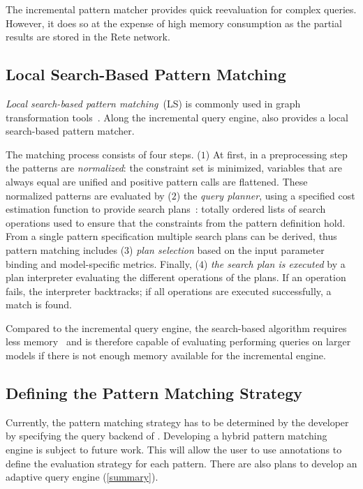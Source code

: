 \documentclass[submission,copyright,creativecommons]{eptcs}
\begin{document}
The incremental pattern matcher provides quick reevaluation for complex queries. However, it does so at the expense of high memory consumption as the partial results are stored in the Rete network.

\subsection{Local Search-Based Pattern Matching}

\emph{Local search-based pattern matching}~(LS) is commonly used in graph transformation tools~\cite{FUJABA,GrGen}. Along the incremental query engine, \eiq also provides a local search-based pattern matcher. 

The matching process consists of four steps. ($1$) At first, in a preprocessing step the patterns are \emph{normalized}: the constraint set is minimized, variables that are always equal are unified and positive pattern calls are flattened. These normalized patterns are evaluated by ($2$) the \emph{query planner}, using a specified cost estimation function to provide search plans~\cite{varro:adaptivesearch}: totally ordered lists of search operations used to ensure that the constraints from the pattern definition hold. From a single pattern specification multiple search plans can be derived, thus pattern matching includes ($3$) \emph{plan selection} based on the input parameter binding and model-specific metrics. Finally, ($4$) \emph{the search plan is executed} by a plan interpreter evaluating the different operations of the plans. If an operation fails, the interpreter backtracks; if all operations are executed successfully, a match is found.

Compared to the incremental query engine, the search-based algorithm requires less memory~\cite{IST15} and is therefore capable of evaluating performing queries on larger models if there is not enough memory available for the incremental engine.

\subsection{Defining the Pattern Matching Strategy}

Currently, the pattern matching strategy has to be determined by the developer by specifying the query backend of \eiq. Developing a hybrid pattern matching engine is subject to future work. This will allow the user to use annotations to define the evaluation strategy for each pattern. There are also plans to develop an adaptive query engine (\autoref{summary}).
\end{document}

